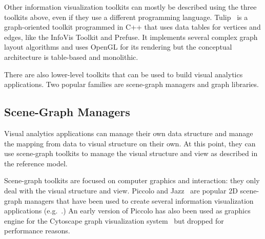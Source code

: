 Other information visualization toolkits can mostly be described using
the three toolkits above, even if they use a different programming
language.  Tulip~\cite{Tulip} is a graph-oriented toolkit programmed in C++ that
uses data tables for vertices and edges, like the InfoVis Toolkit and
Prefuse.  It implements several complex graph layout algorithms and
uses OpenGL for its rendering but the conceptual architecture is
table-based and monolithic.

There are also lower-level toolkits that can be used to build visual
analytics applications.  Two popular families are scene-graph managers
and graph libraries.


\subsection{Scene-Graph Managers}

Visual analytics applications can manage their own data structure and
manage the mapping from data to visual structure on their own.  At
this point, they can use scene-graph toolkits to manage the
visual structure and view as described in the reference model.

Scene-graph toolkits are focused on computer graphics and interaction:
they only deal with the visual structure and view.  Piccolo and
Jazz~\cite{Polylithic} are popular 2D scene-graph managers that have
been used to create several information visualization applications
(e.g.~\cite{SpaceTree,Geneaquilt}.) An early version of Piccolo has
also been used as graphics engine for the Cytoscape graph
visualization system~\cite{Cytoscape} but dropped for performance
reasons.

